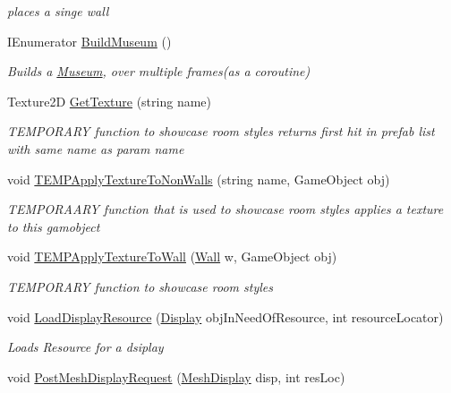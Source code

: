 \begin{DoxyCompactItemize}
\begin{DoxyCompactList}\small\item\em places a singe wall \end{DoxyCompactList}\item 
I\+Enumerator \mbox{\hyperlink{class_museum_builder_a604746b8b55c6d423336f44894063244}{Build\+Museum}} ()
\begin{DoxyCompactList}\small\item\em Builds a \mbox{\hyperlink{class_museum}{Museum}}, over multiple frames(as a coroutine) \end{DoxyCompactList}\item 
Texture2D \mbox{\hyperlink{class_museum_builder_ab416edbde4d42e80e0d27a29ea4595bd}{Get\+Texture}} (string name)
\begin{DoxyCompactList}\small\item\em T\+E\+M\+P\+O\+R\+A\+RY function to showcase room styles returns first hit in prefab list with same name as param name \end{DoxyCompactList}\item 
void \mbox{\hyperlink{class_museum_builder_a3e3b2909202167c6b1e5515317b3cb1e}{T\+E\+M\+P\+Apply\+Texture\+To\+Non\+Walls}} (string name, Game\+Object obj)
\begin{DoxyCompactList}\small\item\em T\+E\+M\+P\+O\+R\+A\+A\+RY function that is used to showcase room styles applies a texture to this gamobject \end{DoxyCompactList}\item 
void \mbox{\hyperlink{class_museum_builder_a892b18a8420e1e96ce712f65bc309068}{T\+E\+M\+P\+Apply\+Texture\+To\+Wall}} (\mbox{\hyperlink{class_wall}{Wall}} w, Game\+Object obj)
\begin{DoxyCompactList}\small\item\em T\+E\+M\+P\+O\+R\+A\+RY function to showcase room styles \end{DoxyCompactList}\item 
void \mbox{\hyperlink{class_museum_builder_a09f7bfa34308891e3a2bf306c2b0d5e2}{Load\+Display\+Resource}} (\mbox{\hyperlink{class_display}{Display}} obj\+In\+Need\+Of\+Resource, int resource\+Locator)
\begin{DoxyCompactList}\small\item\em Loads Resource for a dsiplay \end{DoxyCompactList}\item 
void \mbox{\hyperlink{class_museum_builder_a4e5fce7036671ef7bf735b341e56bbf2}{Post\+Mesh\+Display\+Request}} (\mbox{\hyperlink{class_mesh_display}{Mesh\+Display}} disp, int res\+Loc)

\end{DoxyCompactItemize}
